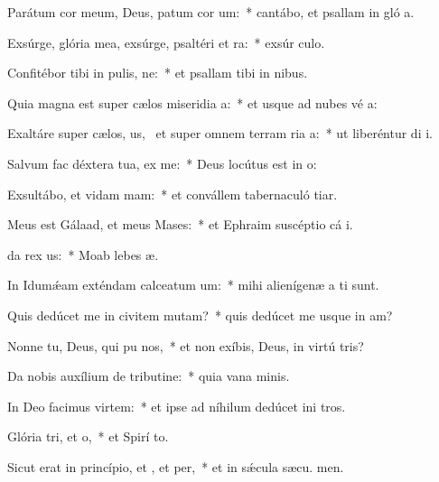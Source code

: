 \item Parátum cor meum, Deus, patum cor um:~* cantábo, et psallam in gló a.
\item Exsúrge, glória mea, exsúrge, psaltéri et ra:~* exsúr culo.
\item Confitébor tibi in pulis, ne:~* et psallam tibi in nibus.
\item Quia magna est super cælos miseridia a:~* et usque ad nubes vé a:
\item Exaltáre super cælos, us,~\pscross{} et super omnem terram ria a:~* ut liberéntur di i.
\item Salvum fac déxtera tua,  ex me:~* Deus locútus est in  o:
\item Exsultábo, et vidam mam:~* et convállem tabernaculó tiar.
\item Meus est Gálaad, et meus  Mases:~* et Ephraim suscéptio cá i.
\item {}da rex us:~* Moab lebes  æ.
\item In Idumǽam exténdam calceatum um:~* mihi alienígenæ a ti sunt.
\item Quis dedúcet me in civitem mutam?~* quis dedúcet me usque in am?
\item Nonne tu, Deus, qui pu nos,~* et non exíbis, Deus, in virtú tris?
\item Da nobis auxílium de tributine:~* quia vana  minis.
\item In Deo facimus virtem:~* et ipse ad níhilum dedúcet ini tros.
\item Glória tri, et o,~* et Spirí to.
\item Sicut erat in princípio, et , et per,~* et in sǽcula sæcu. men.

